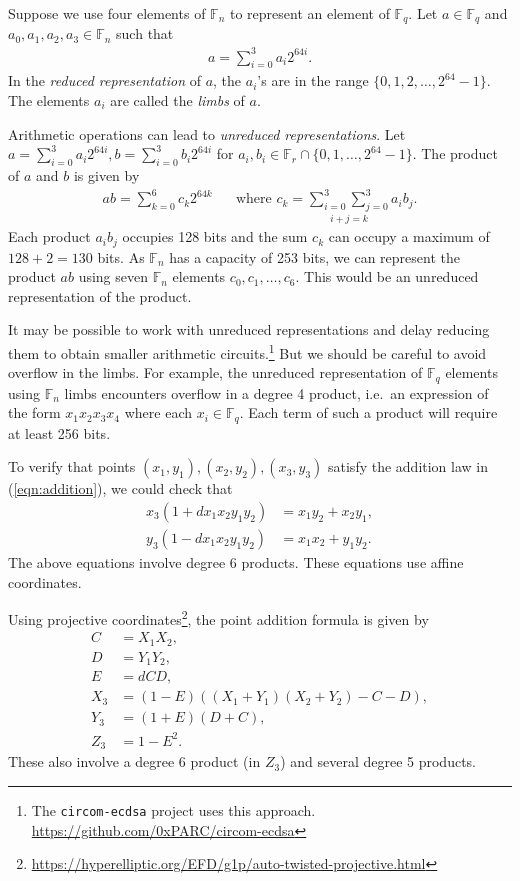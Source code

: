 \documentclass[a4paper, 12pt]{article}
\begin{document}
Suppose we use four elements of $\mathbb{F}_n$ to represent an element of $\mathbb{F}_q$. Let $a \in \mathbb{F}_q$ and $a_0, a_1, a_2, a_3 \in \mathbb{F}_n$ such that
\begin{align*}
  a = \sum^{3}_{i=0} a_i 2^{64i}.
\end{align*}
In the \textit{reduced representation} of $a$, the $a_i$'s are in the range  $\{0,1,2,\ldots,2^{64}-1\}$. The elements $a_i$ are called the \textit{limbs} of $a$.

Arithmetic operations can lead to \textit{unreduced representations}. Let $a=\sum_{i=0}^{3} a_i 2^{64i}, b=\sum_{i=0}^{3} b_i 2^{64i}$ for $a_i, b_i \in \mathbb{F}_{r} \cap \{0,1,\ldots,2^{64}-1\}$. The product of $a$ and $b$ is given by
\begin{align*}
  ab = \sum^{6}_{k=0} c_k 2^{64k}  \ \ \ \ \ \ \text{ where } c_k = \underset{i+j=k}{\sum_{i=0}^3 \sum_{j=0}^3} a_i b_j.
\end{align*}
Each product $a_ib_j$ occupies 128 bits and the sum $c_k$ can occupy a maximum of $128 + 2 = 130$ bits. As $\mathbb{F}_n$ has a capacity of 253 bits, we can represent the product $ab$ using seven $\mathbb{F}_n$ elements $c_0,c_1,\ldots,c_6$. This would be an unreduced representation of the product.

It may be possible to work with unreduced representations and delay reducing them to obtain smaller arithmetic circuits.\footnote{The \texttt{circom-ecdsa} project uses this approach. \url{https://github.com/0xPARC/circom-ecdsa}} But we should be careful to avoid overflow in the limbs. For example, the unreduced representation of $\mathbb{F}_q$ elements using $\mathbb{F}_n$ limbs encounters overflow in a degree 4 product, i.e.~an expression of the form $x_1 x_2 x_3 x_4$ where each $x_i \in \mathbb{F}_q$. Each term of such a product will require at least 256 bits.

To verify that points $(x_1, y_1), (x_2, y_2), (x_3, y_3)$ satisfy the addition law in (\ref{eqn:addition}), we could check that
\begin{align*}
  x_3(1+dx_1x_2y_1y_2) &= x_1y_2 + x_2y_1,\\
  y_3(1-dx_1x_2y_1y_2) &= x_1x_2 + y_1y_2.
\end{align*}
The above equations involve degree 6 products. These equations use affine coordinates.

Using projective coordinates\footnote{\url{https://hyperelliptic.org/EFD/g1p/auto-twisted-projective.html}}, the point addition formula is given by
\begin{align*}
  C   & = X_1X_2,\\
  D   & = Y_1Y_2,\\
  E   & = dCD,\\
  X_3  & = (1-E)((X_1+Y_1)(X_2+Y_2)-C-D),\\
  Y_3  & = (1+E)(D+C),\\
  Z_3  & = 1-E^2.
\end{align*}
These also involve a degree 6 product (in $Z_3$) and several degree 5 products.
\end{document}
